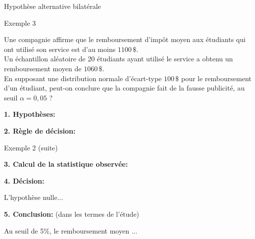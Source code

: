 \documentclass{BeamerTemplate}
\begin{document}
\begin{frame}[t]{Hypothèse alternative bilatérale}
\begin{minipage}{0.48\textwidth}
\end{minipage}
    
\end{frame}

\begin{frame}[t]{Exemple 3}

{\small
Une compagnie affirme que le remboursement d'imp\^ot moyen aux étudiants qui ont utilisé
son service est d'au moins $1100 \,\$$. \\
Un échantillon aléatoire de 20 étudiants ayant utilisé le service a obtenu un remboursement moyen de $1060 \,\$$. \\
En supposant une distribution normale d'écart-type $100 \,\$$ pour le remboursement d'un étudiant, peut-on conclure que la compagnie fait de la fausse publicité, au seuil $\alpha = 0,05$ ?}\\

\bigskip

{\bf 1. Hypothèses:}
\bigskip

{\bf 2. Règle de décision:}

\end{frame}

\begin{frame}[t]{Exemple 2 (suite)}

{\bf 3. Calcul de la statistique observée:}

\vfill
{\bf 4. Décision:}

L'hypothèse nulle...

\bigskip
{\bf 5. Conclusion:} (dans les termes de l'étude)

Au seuil de 5\%, le remboursement moyen ...
\bigskip
\end{frame}
\end{document}
